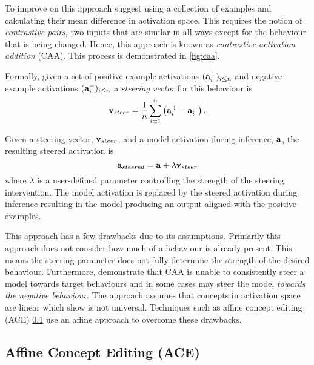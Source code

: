 To improve on this approach \citet{caa} suggest using a collection of examples and calculating their mean difference in activation space.
This requires the notion of \emph{contrastive pairs}, two inputs that are similar in all ways except for the behaviour that is being changed.
Hence, this approach is known as \emph{contrastive activation addition} (CAA).
This process is demonstrated in \cref{fig:caa}.

Formally, given a set of positive example activations $(\mathbf{a}_i^+)_{i\le n}$ and negative example activations $(\mathbf{a}_i^-)_{i\le n}$ a \emph{steering vector} for this behaviour is
\[\mathbf{v}_{steer} = \frac{1}{n}\sum_{i=1}^{n}\left(\mathbf{a}_i^+ - \mathbf{a}_i^-\right).\]

Given a steering vector, $\mathbf{v}_{steer}$, and a model activation during inference, $\mathbf{a}$, the resulting steered activation is
\begin{equation}
    \label{eq:caa}
    \mathbf{a}_{steered} = \mathbf{a} + \lambda\mathbf{v}_{steer}
\end{equation}
where $\lambda$ is a user-defined parameter controlling the strength of the steering intervention.
The model activation is replaced by the steered activation during inference resulting in the model producing an output aligned with the positive examples.

This approach has a few drawbacks \citep{steerability, ace, non-linear-features} due to its assumptions.
Primarily this approach does not consider how much of a behaviour is already present.
This means the steering parameter does not fully determine the strength of the desired behaviour.
Furthermore, \citet{steerability} demonstrate that CAA is unable to consistently steer a model towards target behaviours and in some cases may steer the model \emph{towards the negative behaviour}.
The approach assumes that concepts in activation space are linear which \citet{non-linear-features} show is not universal.
Techniques such as affine concept editing (ACE) \cref{sec:ace} use an affine approach to overcome these drawbacks.

\subsection{Affine Concept Editing (ACE)}
\label{sec:ace}


